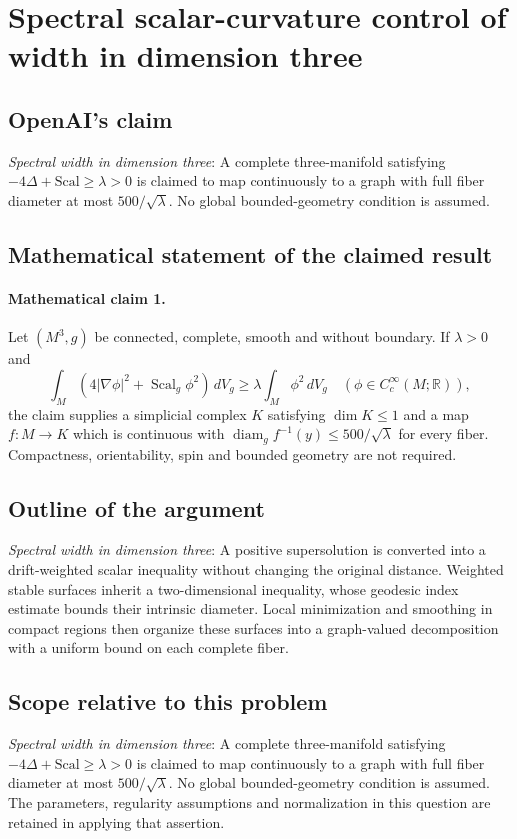 \documentclass[11pt]{article}
\begin{document}
\section*{Spectral scalar-curvature control of width in dimension three}

\subsection{OpenAI's claim}
\textit{Spectral width in dimension three}: A complete three-manifold satisfying $-4\Delta+\mathrm{Scal}\ge\lambda>0$ is claimed to map continuously to a graph with full fiber diameter at most $500/\sqrt\lambda$. No global bounded-geometry condition is assumed.

\subsection{Mathematical statement of the claimed result}
\paragraph{Mathematical claim 1.} Let $(M^3,g)$ be connected, complete, smooth and without boundary. If $\lambda>0$ and \[\int_M(4|\nabla\phi|^2+\operatorname{Scal}_g\phi^2)\,dV_g\ge\lambda\int_M\phi^2\,dV_g\quad(\phi\in C_c^\infty(M;\mathbb R)),\] the claim supplies a simplicial complex $K$ satisfying $\dim K\le1$ and a map $f:M\to K$ which is continuous with $\operatorname{diam}_g f^{-1}(y)\le500/\sqrt\lambda$ for every fiber. Compactness, orientability, spin and bounded geometry are not required.

\subsection{Outline of the argument}
\textit{Spectral width in dimension three}: A positive supersolution is converted into a drift-weighted scalar inequality without changing the original distance. Weighted stable surfaces inherit a two-dimensional inequality, whose geodesic index estimate bounds their intrinsic diameter. Local minimization and smoothing in compact regions then organize these surfaces into a graph-valued decomposition with a uniform bound on each complete fiber.

\subsection{Scope relative to this problem}
\textit{Spectral width in dimension three}: A complete three-manifold satisfying $-4\Delta+\mathrm{Scal}\ge\lambda>0$ is claimed to map continuously to a graph with full fiber diameter at most $500/\sqrt\lambda$. No global bounded-geometry condition is assumed. The parameters, regularity assumptions and normalization in this question are retained in applying that assertion.
\end{document}
